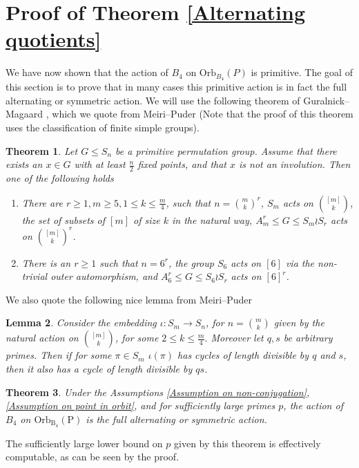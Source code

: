 \documentclass[letterpaper]{amsart}
\newtheorem{theorem}{Theorem}[section]
\newtheorem{lemma}[theorem]{Lemma}
\begin{document}
\section{Proof of Theorem \ref{Alternating quotients}}
We have now shown that the action of $B_4$ on $\mathrm{Orb}_{B_4}(P)$ is primitive. The goal of this section is to prove that in many cases this primitive action is in fact the full alternating or symmetric action. We will use the following theorem of Guralnick--Magaard \cite[Theorem 1]{guralnick1998minimal}, which we quote from Meiri--Puder \cite[Theorem 4.13]{meiri2018markoff} (Note that the proof of this theorem uses the classification of finite simple groups).
\begin{theorem}
\label{CFSG alternating}
    Let $G \leq S_n$ be a primitive permutation group. Assume that there exists an $x \in G$ with at least $\frac{n}{2}$ fixed points, and that $x$ is not an involution. Then one of the following holds
    \begin{enumerate}
    \item There are $r \geq 1, m\geq 5, 1 \leq k \leq \frac{m}{4}$, such that $n=\binom{m}{k}^r$, $S_m$ acts on $\binom{[m]}{k}$, the set of subsets of $[m]$ of size $k$ in the natural way, $A_m^r \leq G \leq S_m \wr S_r$ acts on $\binom{[m]}{k}^r$.
    \item There is an $r \geq 1$ such that $n = 6^r$, the group $S_6$ acts on $[6]$ via the non-trivial outer automorphism, and $A_6^r \leq G \leq S_6 \wr S_r$ acts on $[6]^r$.
    \end{enumerate}
\end{theorem}
We also quote the following nice lemma from Meiri--Puder \cite{meiri2018markoff}
\begin{lemma}
\label{primes in subset action}
    Consider the embedding $\iota:S_m\to S_n$, for $n = \binom{m}{k}$ given by the natural action on $\binom{[m]}{k}$, for some $2 \leq k \leq \frac{m}{4}.$ Moreover let $q,s$ be arbitrary primes. Then if for some $\pi \in S_m$ $\iota(\pi)$ has cycles of length divisible by $q$ and $s$, then it also has a cycle of length divisible by $qs$.
\end{lemma}

\begin{theorem}
\label{Alternating action on orbit}
    Under the Assumptions  \ref{Assumption on non-conjugation},\ref{Assumption on point in orbit}, and for sufficiently large primes $p$, the action of $B_4$ on $\mathrm{Orb_{B_4}(P)}$ is the full alternating or symmetric action.
\end{theorem}
The sufficiently large lower bound on $p$ given by this theorem is effectively computable, as can be seen by the proof.
\end{document}
